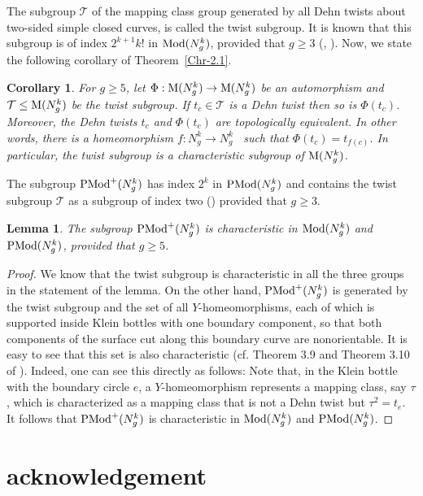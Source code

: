 \documentclass[11 pt]{amsart}
\newtheorem{Corollary}[Theorem]{Corollary}
\newtheorem{Lemma}[Theorem]{Lemma}
\theoremstyle{definition}
\begin{document}
The subgroup $\mathcal{T}$ of the mapping class group generated by
all Dehn twists about two-sided simple closed curves, is called the
twist subgroup. It is known that this subgroup is of index $2^{k+1} k!$
in ${\rm Mod}(N_{g}^{k})$, provided that $g \geq 3$ (\cite{K},  \cite{SM2}).
Now, we state the following corollary of Theorem~\ref{Chr-2.1}.

\begin{Corollary}\label{Cor-AlgChr}
For $g\geq 5$, let $\Phi:{\rm M}(N_g^k)\rightarrow{\rm M}(N_g^k)$ be
an automorphism and $\mathcal{T}\leq {\rm M}(N_g^k)$ be the twist
subgroup. If $t_c\in \mathcal{T}$ is a Dehn twist then so is
$\Phi(t_c)$.  Moreover, the Dehn twists $t_c$ and $\Phi(t_c)$ are
topologically equivalent. In other words, there is a homeomorphism
$f:N_g^k\rightarrow N_g^k$ \ such that $\Phi(t_c)=t_{f(c)}$. In
particular, the twist subgroup is a characteristic subgroup of ${\rm
M}(N_g^k)$.
\end{Corollary}

The subgroup ${\rm PMod}^{+}(N_{g}^{k})$ has index $2^k$ in ${\rm
PMod}(N_{g}^{k})$ and contains the twist subgroup $\mathcal{T}$ as a
subgroup of index two (\cite{SM2}) provided that $g\geq 3$.

\begin{Lemma}\label{Lem-Chr-PMPlus}
The subgroup ${\rm PMod}^{+}(N_{g}^{k})$ is characteristic in ${\rm
Mod}(N_{g}^{k})$ and ${\rm PMod}(N_{g}^{k})$, provided that $g\geq
5$.
\end{Lemma}

\begin{proof}
We know that the twist subgroup is characteristic in all the three
groups in the statement of the lemma. On the other hand, ${\rm
PMod}^{+}(N_g^k)$ is generated by the twist subgroup and the set of
all $Y$-homeomorphisms, each of which is supported inside Klein
bottles with one boundary component, so that both components of the
surface cut along this boundary curve are nonorientable. It is easy
to see that this set is also characteristic (cf. Theorem 3.9 and
Theorem 3.10 of \cite{A}). Indeed, one can see this directly as
follows: Note that, in the Klein bottle with the boundary circle
$e$, a $Y$-homeomorphism represents a mapping class, say $\tau$,
which is characterized as a mapping class that is not a Dehn twist
but $\tau^2=t_e$. It follows that ${\rm PMod}^{+}(N_g^k)$ is
characteristic in ${\rm Mod}(N_g^k)$ and ${\rm PMod}(N_g^k)$.
\end{proof}

\section*{acknowledgement}
\end{document}
